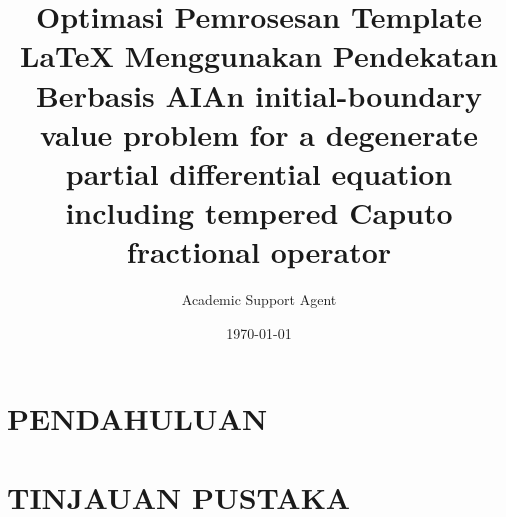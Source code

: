 \documentclass{article}
\title{Optimasi Pemrosesan Template LaTeX Menggunakan Pendekatan Berbasis AI}
\author{Academic Support Agent}
\date{\today}
\begin{document}
\maketitle

\begin{abstract}

\end{abstract}

\chapter{PENDAHULUAN}


\chapter{TINJAUAN PUSTAKA}




\usepackage{mib}

\usepackage[T2A]{fontenc}
\usepackage{color}
\usepackage[utf8]{inputenc} %
\usepackage[T1]{fontenc}    %
\usepackage{hyperref}       %
\usepackage{url}            %
\usepackage{booktabs}       %
\usepackage{amsfonts}       %
\usepackage{nicefrac}       %
\usepackage{microtype}      %
\usepackage{lipsum}
\usepackage{graphicx}
\usepackage{color}
\usepackage{amsthm,amsmath,amssymb}
\usepackage[english, russian]{babel}
\setcounter{page}{1}


\title{An initial-boundary value problem for a degenerate partial differential equation including tempered Caputo fractional operator}
\end{document}
